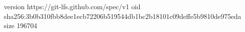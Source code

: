 version https://git-lfs.github.com/spec/v1
oid sha256:3b0b310fbb8dee1ecb72206b519544db1bc2b18101c09deffe5b9810de975eda
size 196704
